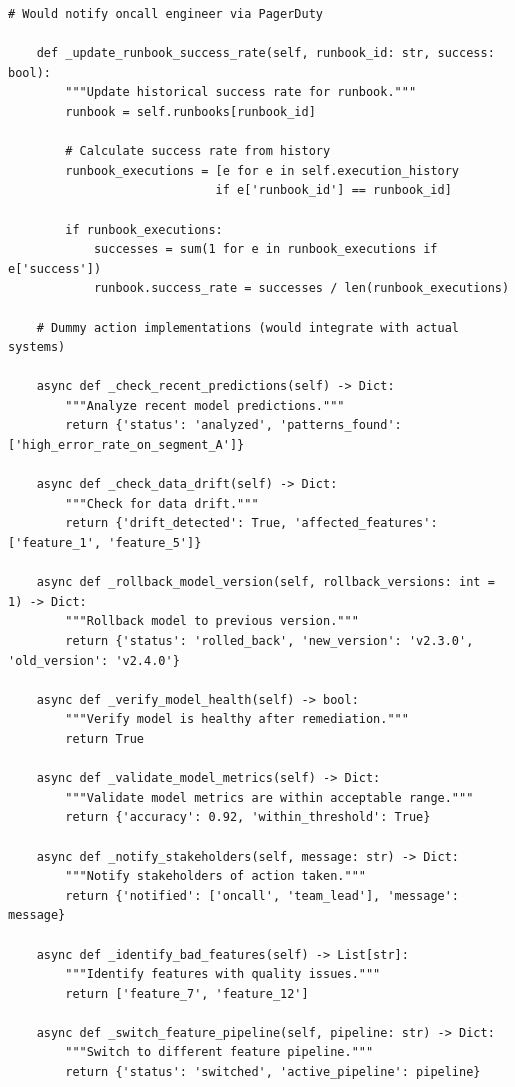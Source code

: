 \begin{lstlisting}[style=python, caption={Runbook automation with guided remediation}]
        # Would notify oncall engineer via PagerDuty

    def _update_runbook_success_rate(self, runbook_id: str, success: bool):
        """Update historical success rate for runbook."""
        runbook = self.runbooks[runbook_id]

        # Calculate success rate from history
        runbook_executions = [e for e in self.execution_history
                             if e['runbook_id'] == runbook_id]

        if runbook_executions:
            successes = sum(1 for e in runbook_executions if e['success'])
            runbook.success_rate = successes / len(runbook_executions)

    # Dummy action implementations (would integrate with actual systems)

    async def _check_recent_predictions(self) -> Dict:
        """Analyze recent model predictions."""
        return {'status': 'analyzed', 'patterns_found': ['high_error_rate_on_segment_A']}

    async def _check_data_drift(self) -> Dict:
        """Check for data drift."""
        return {'drift_detected': True, 'affected_features': ['feature_1', 'feature_5']}

    async def _rollback_model_version(self, rollback_versions: int = 1) -> Dict:
        """Rollback model to previous version."""
        return {'status': 'rolled_back', 'new_version': 'v2.3.0', 'old_version': 'v2.4.0'}

    async def _verify_model_health(self) -> bool:
        """Verify model is healthy after remediation."""
        return True

    async def _validate_model_metrics(self) -> Dict:
        """Validate model metrics are within acceptable range."""
        return {'accuracy': 0.92, 'within_threshold': True}

    async def _notify_stakeholders(self, message: str) -> Dict:
        """Notify stakeholders of action taken."""
        return {'notified': ['oncall', 'team_lead'], 'message': message}

    async def _identify_bad_features(self) -> List[str]:
        """Identify features with quality issues."""
        return ['feature_7', 'feature_12']

    async def _switch_feature_pipeline(self, pipeline: str) -> Dict:
        """Switch to different feature pipeline."""
        return {'status': 'switched', 'active_pipeline': pipeline}


\end{lstlisting}
